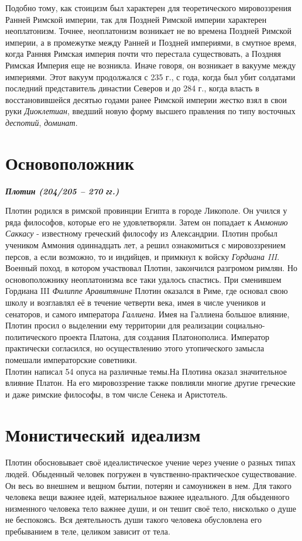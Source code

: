 \documentclass[a4paper,12pt]{article}
\begin{document}
\medskip
Подобно тому, как стоицизм был характерен для теоретического мировоззрения Ранней Римской империи, так для Поздней Римской империи характерен неоплатонизм. Точнее, неоплатонизм возникает не во времена Поздней Римской империи, а в промежутке между Ранней и Поздней империями, в смутное время, когда Ранняя Римская империя почти что перестала существовать, а Поздняя Римская Империя еще не возникла. Иначе говоря, он возникает в вакууме между империями. Этот вакуум продолжался с 235 г., с года, когда был убит солдатами последний представитель династии Северов и до 284 г., когда власть в восстановившейся десятью годами ранее Римской империи жестко взял в свои руки \textit{Диоклетиан}, введший новую форму высшего правления по типу восточных \textit{деспотий}, \textit{доминат}.
\newpage
\part{Основоположник}
\begin{center}
\textbf{\textit{Плотин (204/205 – 270 гг.)}}
\end{center}
Плотин родился в римской провинции Египта в городе Ликополе. Он учился у ряда философов, которые его не удовлетворяли. Затем он попадает к \textit{Аммонию Саккасу} - известному греческий философу из Александрии. Плотин пробыл учеником Аммония одиннадцать лет, а решил ознакомиться с мировоззрением персов, а если возможно, то и индийцев, и примкнул к войску \textit{Гордиана III}. Военный поход, в котором участвовал Плотин, закончился разгромом римлян. Но основоположнику неоплатонизма все таки удалось спастись. При сменившем Гордиана III \textit{Филиппе Аравитянине} Плотин оказался в Риме, где основал свою школу и возглавлял её в течение четверти века, имея в числе учеников и сенаторов, и самого императора \textit{Галлиена}. Имея на Галлиена большое влияние, Плотин просил о выделении ему территории для реализации социально-политического проекта Платона, для создания Платонополиса. Император практически согласился, но осуществлению этого утопического замысла помешали императорские советники.\\

\medskip
Плотин написал 54 опуса на различные темы.На Плотина оказал значительное влияние Платон. На его мировоззрение также повлияли многие другие греческие и даже римские философы, в том числе Сенека и Аристотель.
\newpage
\part{Монистический идеализм}
Плотин обосновывает своё идеалистическое учение через учение о разных типах людей. Обыденный человек погружен в чувственно-практическое существование. Он весь во внешнем и вещном бытии, потерян и самоунижен в нем. Для такого человека вещи важнее идей, материальное важнее идеального. Для обыденного низменного человека тело важнее души, и он тешит своё тело, нисколько о душе не беспокоясь. Вся деятельность души такого человека обусловлена его пребыванием в теле, целиком зависит от тела.\\
\end{document}
